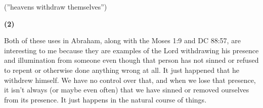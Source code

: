 \begin{compactdesc}
				\item[Other interesting uses of ``withdraw''] \phantom{.}
					\begin{compactitem}
						\item[{\hyperref[DC88-57]{DC 88:57}}]
						\item[{\hyperref[DC121-37]{DC 121:37}}] (''heavens withdraw themselves'')
						\item[{\hyperref[MOSES-1-9]{Moses 1:9}}]
						\item[{\hyperref[ABRAHAM-2-12]{Abraham 2:12}}] \textbf{(2)} \phantom{.}
							\begin{compactitem}
								\item Both of these uses in Abraham, along with the Moses 1:9 and DC 88:57, are interesting to me because they are examples of the Lord withdrawing his presence and illumination from someone even though that person has not sinned or refused to repent or otherwise done anything wrong at all. It just happened that he withdrew himself. We have no control over that, and when we lose that presence, it isn't always (or maybe even often) that we have sinned or removed ourselves from its presence. It just happens in the natural course of things.
							\end{compactitem}
					\end{compactitem}
					
			\end{compactdesc}